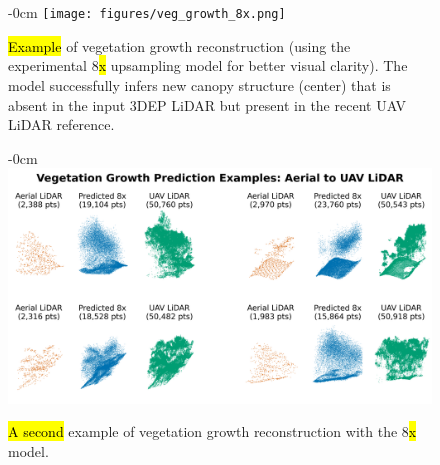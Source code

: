 \documentclass[remotesensing,article,accept,pdftex,moreauthors]{Definitions/mdpi}
\begin{document}
\appendixstart
\appendix
\section[\appendixname~\thesection]{\label{app1}}


\vspace{-12pt}
\begin{figure}[H]
\begin{adjustwidth}{-\extralength}{0cm}
    \centering
    \texttt{[image: figures/veg\_growth\_8x.png]}
    \end{adjustwidth}
    \caption{\hl{Example} %
 of vegetation growth reconstruction (using the experimental 8\hl{x} %
 upsampling model for better visual clarity). The model successfully infers new canopy structure (center) that is absent in the input 3DEP LiDAR but present in the recent UAV LiDAR reference.}
    \label{fig:appendix_growth1}
\end{figure}

\begin{figure}[H]
\begin{adjustwidth}{-\extralength}{0cm}
    \centering
    \includegraphics[width=0.98\linewidth]{figures/veg_growth2_8x.png}
    \end{adjustwidth}
    \caption{\hl{A second} %
 example of vegetation growth reconstruction with the 8\hl{x} %
 model.}
    \label{fig:appendix_growth2}
\end{figure} 
\end{document}
